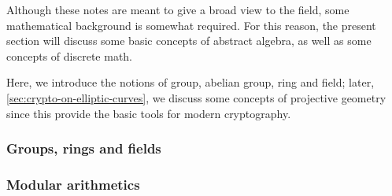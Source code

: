 \documentclass{subfiles}
\begin{document}
    Although these notes are meant to give a broad view to the field,
        some mathematical background is somewhat required.
        For this reason, the present section will discuss some basic concepts of abstract algebra,
        as well as some concepts of discrete math.

    Here, we introduce the notions of group, abelian group, ring and field;
        later, \cref{sec:crypto-on-elliptic-curves},
        we discuss some concepts of projective geometry since this provide the basic tools for 
        modern cryptography.

    \subsubsection{Groups, rings and fields}
    

    \subsubsection{Modular arithmetics}
    
\end{document}

